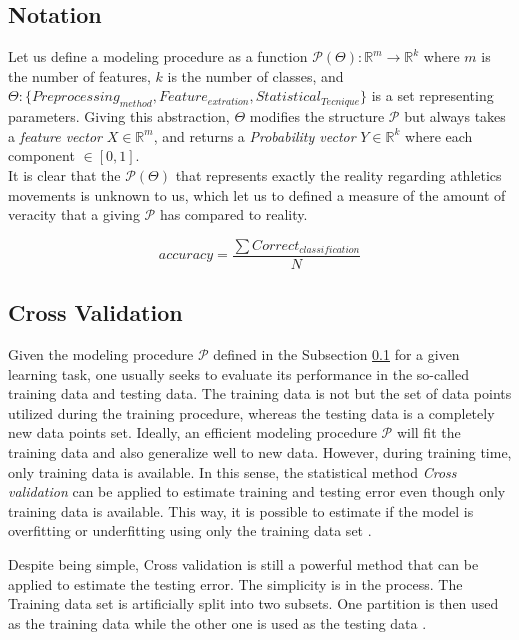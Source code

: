 \subsection{Notation} \label{notation}
Let us define a modeling procedure as a function $\mathcal{P}(\Theta): \mathbb{R}^{m} \longrightarrow \mathbb{R}^{k}$ where $m$ is the number of features, $k$ is the number of classes, and $\Theta : \{Preprocessing_{method}, Feature_{extration}, Statistical_{Tecnique} \}$ is a set representing parameters. Giving this abstraction, $\Theta$ modifies the structure  $\mathcal{P}$ but always takes a \textit{feature vector} $X \in  \mathbb{R}^{m}$, and returns a \textit{Probability vector} $Y \in  \mathbb{R}^{k}$ where each component $\in  [0,1]$.\\

It is clear that the $\mathcal{P}(\Theta)$ that represents exactly the reality regarding athletics movements is unknown to us, which let us to defined a measure of the amount of veracity that a giving $\mathcal{P}$ has compared to reality.

\begin{equation}
accuracy=  \frac{\sum Correct_{classification}}{N}
\end{equation}

\subsection{Cross Validation}

Given the modeling procedure $\mathcal{P}$ defined in the Subsection \ref{notation}
for a given learning task, one usually seeks to evaluate its performance in the
so-called training data and testing data. The training data is not but the set of
data points utilized during the training procedure, whereas the testing data is a
completely new data points set. Ideally, an efficient modeling procedure
$\mathcal{P}$ will fit the training data and also generalize well to new data.
However, during training time, only training data is available. In this sense, the
statistical method \textit{Cross validation} can be applied to estimate training
and testing error even though only training data is available. This way, it is
possible to estimate if the model is overfitting or underfitting using only the
training data set \cite{lecturenotes}.

Despite being simple, Cross validation is still a powerful method that can be
applied to estimate the testing error. The simplicity is in the process. The
Training data set is artificially split into two subsets. One partition is then
used as the training data while the other one is used as the testing data 
\cite{lecturenotes}.

